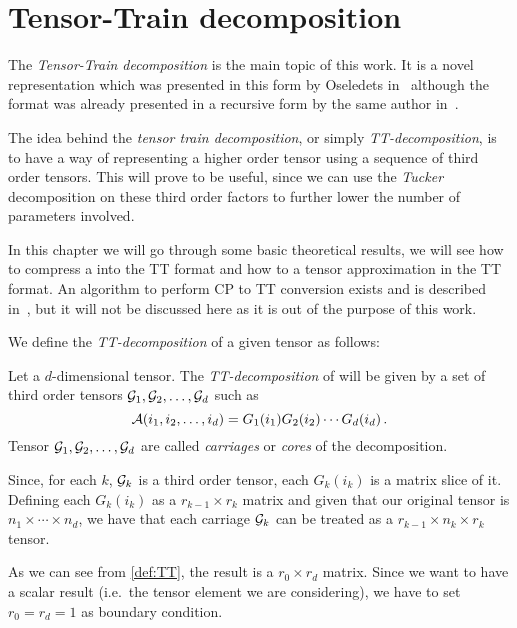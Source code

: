 \chapter{Tensor-Train decomposition}

The \emph{Tensor-Train decomposition} is the main topic of this work. It is a novel representation which was presented in this form by Oseledets in~\cite{oseledets2011tt} although the format was already presented in a recursive form by the same author in~\cite{oseledetstyrty2009}.

The idea behind the \emph{tensor train decomposition}, or simply \emph{TT-decomposition}, is to have a way of representing a higher order tensor using a sequence of third order tensors. This will prove to be useful, since we can use the \emph{Tucker} decomposition on these third order factors to further lower the number of parameters involved.

In this chapter we will go through some basic theoretical results, we will see how to compress a  into the TT format and how to  a tensor approximation in the TT format. An algorithm to perform CP to TT conversion exists and is described in~\cite{oseledets2011tt}, but it will not be discussed here as it is out of the purpose of this work.

We define the \emph{TT-decomposition} of a given tensor \A as follows:

\begin{Def}
  Let \A a $d$-dimensional tensor. The \emph{TT-decomposition} of \A will be given by a set of third order tensors $\mathcal{G}_1,\mathcal{G}_2,\dots,\mathcal{G}_d$ such as
  \begin{equation} \label{def:TT}
    \mathcal{A}(i_1,i_2,\dots,i_d) = G_1(i_1)G_2(i_2)\cdots G_d(i_d)\, .
  \end{equation}
  Tensor $\mathcal{G}_1,\mathcal{G}_2,\dots,\mathcal{G}_d$ are called \emph{carriages} or \emph{cores} of the decomposition.
\end{Def}

Since, for each $k$, $\mathcal{G}_k$ is a third order tensor, each $G_k(i_k)$ is a matrix slice of it. Defining each $G_k(i_k)$ as a $r_{k-1} \times r_k$ matrix and given that our original tensor \A is $n_1 \times \cdots \times n_d$, we have that each carriage $\mathcal{G}_k$ can be treated as a $r_{k-1} \times n_k \times r_k$ tensor.

As we can see from \eqref{def:TT}, the result is a $r_0 \times r_d$ matrix. Since we want to have a scalar result (i.e.\ the tensor element we are considering), we have to set $r_0 = r_d = 1$ as boundary condition.


